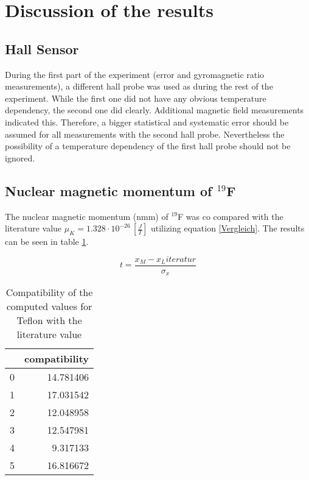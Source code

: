 \section{Discussion of the results}
\subsection{Hall Sensor}
During the first part of the experiment (error and gyromagnetic ratio measurements), a different hall probe was used as during the rest of the experiment. While the first one did not have any obvious temperature dependency, the second one did clearly. Additional magnetic field measurements indicated this. Therefore, a bigger statistical and systematic error should be assumed for all measurements with the second hall probe. Nevertheless the possibility of a temperature dependency of the first hall probe should not be ignored. 

\subsection{Nuclear magnetic momentum of $^{19}$F}
The nuclear magnetic momentum (nmm) of $^{19}$F was co compared with the literature value $\mu_K =1.328\cdot 10^{-26}\,\left[\frac{J}{T}\right]$ \cite{demtr} utilizing equation \ref{Vergleich}. The results can be seen in table \ref{vlg_f}.


\begin{equation}
t=\frac{x_M-x_Literatur}{\sigma_x}
\label{Vergleich}
\end{equation}

\begin{table}
	\caption{Compatibility of the computed values for Teflon with the literature value}
	\label{vlg_f}
	\centering
	\begin{tabular}{lr}
		\toprule
		{} &  compatibility \\
		\midrule
		0 &      14.781406 \\
		1 &      17.031542 \\
		2 &      12.048958 \\
		3 &      12.547981 \\
		4 &       9.317133 \\
		5 &      16.816672 \\
		\bottomrule
	\end{tabular}
\end{table}

